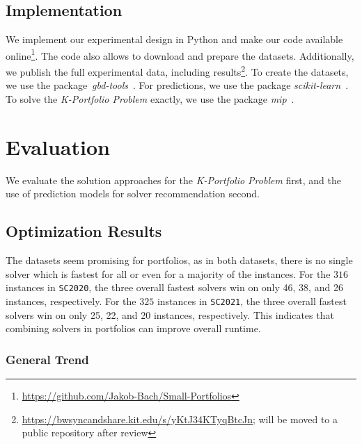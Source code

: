 \documentclass[runningheads]{llncs}
\begin{document}
\subsection{Implementation}
\label{sec:experimental-design:impl}

We implement our experimental design in Python and make our code available online\footnote{\url{https://github.com/Jakob-Bach/Small-Portfolios}}.
The code also allows to download and prepare the datasets.
Additionally, we publish the full experimental data, including results\footnote{\url{https://bwsyncandshare.kit.edu/s/yKtJ34KTyqBtcJn}; will be moved to a public repository after review}.
To create the datasets, we use the package~\emph{gbd-tools}~\cite{iser2020collaborative}.
For predictions, we use the package \emph{scikit-learn}~\cite{scikit-learn}.
To solve the \emph{K-Portfolio Problem} exactly, we use the package \emph{mip}~\cite{python-mip}.

\section{Evaluation}
\label{sec:evaluation}

We evaluate the solution approaches for the \emph{K-Portfolio Problem} first, and the use of prediction models for solver recommendation second.

\subsection{Optimization Results}

The datasets seem promising for portfolios, as in both datasets, there is no single solver which is fastest for all or even for a majority of the instances.
For the $316$ instances in \texttt{SC2020}, the three overall fastest solvers win on only 46, 38, and 26 instances, respectively.
For the $325$ instances in \texttt{SC2021}, the three overall fastest solvers win on only 25, 22, and 20 instances, respectively.
This indicates that combining solvers in portfolios can improve overall runtime.

\subsubsection{General Trend}
\end{document}
